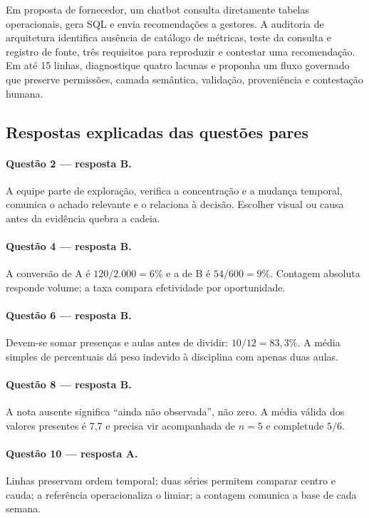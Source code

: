 \TextoBase Em proposta de fornecedor, um chatbot consulta diretamente tabelas operacionais, gera SQL e envia recomendações a gestores. A auditoria de arquitetura identifica ausência de catálogo de métricas, teste da consulta e registro de fonte, três requisitos para reproduzir e contestar uma recomendação.
\FonteDidatica
\Comando Em até 15 linhas, diagnostique quatro lacunas e proponha um fluxo governado que preserve permissões, camada semântica, validação, proveniência e contestação humana.

\newpage
\subsection{Respostas explicadas das questões pares}
\paragraph{Questão 2 — resposta B.} A equipe parte de exploração, verifica a concentração e a mudança temporal, comunica o achado relevante e o relaciona à decisão. Escolher visual ou causa antes da evidência quebra a cadeia.
\paragraph{Questão 4 — resposta B.} A conversão de A é $120/2.000=6\%$ e a de B é $54/600=9\%$. Contagem absoluta responde volume; a taxa compara efetividade por oportunidade.
\paragraph{Questão 6 — resposta B.} Devem-se somar presenças e aulas antes de dividir: $10/12=83{,}3\%$. A média simples de percentuais dá peso indevido à disciplina com apenas duas aulas.
\paragraph{Questão 8 — resposta B.} A nota ausente significa ``ainda não observada'', não zero. A média válida dos valores presentes é 7,7 e precisa vir acompanhada de $n=5$ e completude $5/6$.
\paragraph{Questão 10 — resposta A.} Linhas preservam ordem temporal; duas séries permitem comparar centro e cauda; a referência operacionaliza o limiar; a contagem comunica a base de cada semana.
